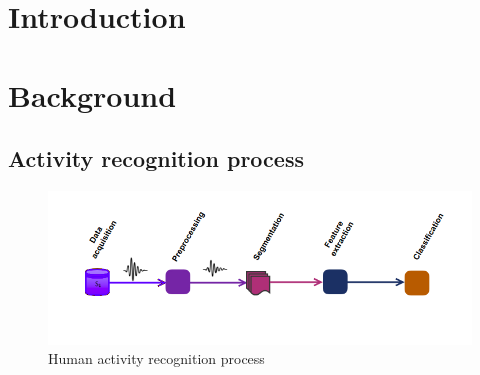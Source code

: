 \section{Introduction}

\section{Background}
\subsection{Activity recognition process}\label{subsec:ARP}

\begin{figure}[h]
    \centering
    \includegraphics[width=.5\textwidth]{Figures/HARP.png}
    \caption{Human activity recognition process}
    \label{fig:tsprocess}
\end{figure}





